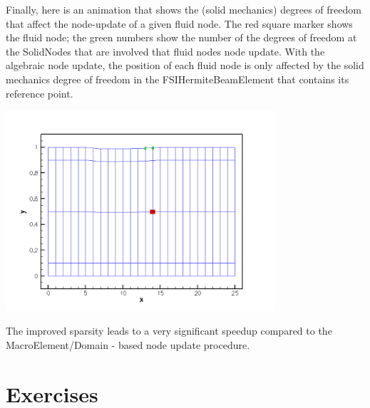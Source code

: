 Finally, here is an animation that shows the (solid mechanics) degrees of freedom that affect the node-\/update of a given fluid node. The red square marker shows the fluid node; the green numbers show the number of the degrees of freedom at the {\ttfamily Solid\+Nodes} that are involved that fluid node\textquotesingle{}s node update. With the algebraic node update, the position of each fluid node is only affected by the solid mechanics degree of freedom in the {\ttfamily F\+S\+I\+Hermite\+Beam\+Element} that contains its reference point.

 
\begin{DoxyImage}
\includegraphics[width=0.75\textwidth]{fsi_fluid_nodes}
\end{DoxyImage}


The improved sparsity leads to a very significant speedup compared to the {\ttfamily Macro\+Element/\+Domain} -\/ based node update procedure.



 

\hypertarget{index_ex}{}\section{Exercises}\label{index_ex}

